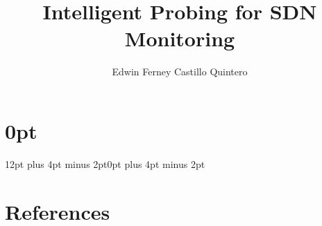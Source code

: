 \documentclass[11pt,twoside]{thesis_proposal-dtm_unicauca} %
\title{Intelligent Probing for SDN Monitoring}
\author{Edwin Ferney Castillo Quintero}
\begin{document}
\maketitle
\begin{romanpages}
\renewcommand{\contentsname}{\LARGE\centerline{Contents}}
\tableofcontents{}
\end{romanpages}
\setlength{\parskip}{1em}
\titlespacing\section{0pt}{12pt plus 4pt minus 2pt}{0pt plus 4pt minus 2pt}

%

%

%
%
%
\renewcommand\refname{\vskip -15mm}
\section{References}
\label{references}
\small


\end{document}
